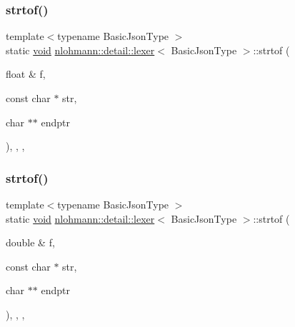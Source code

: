\subsubsection{\texorpdfstring{strtof()}{strtof()}\hspace{0.1cm}{\footnotesize\ttfamily [1/3]}}
{\footnotesize\ttfamily template$<$typename Basic\+Json\+Type $>$ \\
static \mbox{\hyperlink{namespacenlohmann_1_1detail_a59fca69799f6b9e366710cb9043aa77d}{void}} \mbox{\hyperlink{classnlohmann_1_1detail_1_1lexer}{nlohmann\+::detail\+::lexer}}$<$ Basic\+Json\+Type $>$\+::strtof (\begin{DoxyParamCaption}\item[{float \&}]{f,  }\item[{const char $\ast$}]{str,  }\item[{char $\ast$$\ast$}]{endptr }\end{DoxyParamCaption})\hspace{0.3cm}{\ttfamily [inline]}, {\ttfamily [static]}, {\ttfamily [private]}, {\ttfamily [noexcept]}}

\mbox{\label{classnlohmann_1_1detail_1_1lexer_a8cd877d10b31bc819e4f030292737ea6}} 
\subsubsection{\texorpdfstring{strtof()}{strtof()}\hspace{0.1cm}{\footnotesize\ttfamily [2/3]}}
{\footnotesize\ttfamily template$<$typename Basic\+Json\+Type $>$ \\
static \mbox{\hyperlink{namespacenlohmann_1_1detail_a59fca69799f6b9e366710cb9043aa77d}{void}} \mbox{\hyperlink{classnlohmann_1_1detail_1_1lexer}{nlohmann\+::detail\+::lexer}}$<$ Basic\+Json\+Type $>$\+::strtof (\begin{DoxyParamCaption}\item[{double \&}]{f,  }\item[{const char $\ast$}]{str,  }\item[{char $\ast$$\ast$}]{endptr }\end{DoxyParamCaption})\hspace{0.3cm}{\ttfamily [inline]}, {\ttfamily [static]}, {\ttfamily [private]}, {\ttfamily [noexcept]}}

